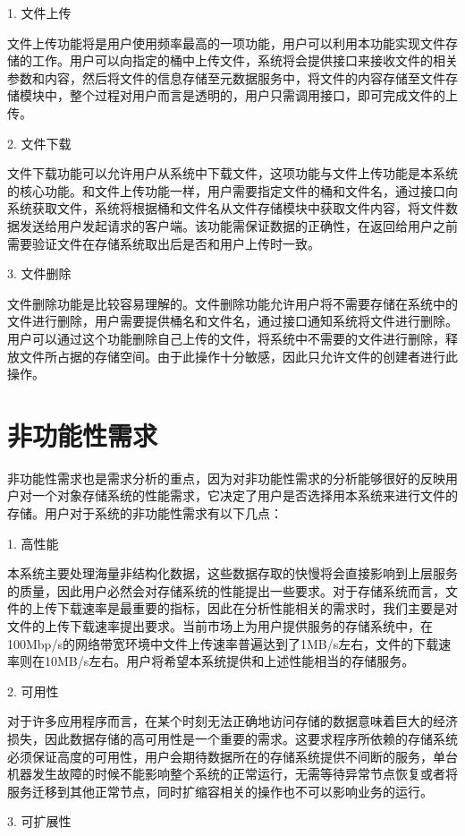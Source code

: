 1. 文件上传

文件上传功能将是用户使用频率最高的一项功能，用户可以利用本功能实现文件存储的工作。用户可以向指定的桶中上传文件，系统将会提供接口来接收文件的相关参数和内容，然后将文件的信息存储至元数据服务中，将文件的内容存储至文件存储模块中，整个过程对用户而言是透明的，用户只需调用接口，即可完成文件的上传。

2. 文件下载

文件下载功能可以允许用户从系统中下载文件，这项功能与文件上传功能是本系统的核心功能。和文件上传功能一样，用户需要指定文件的桶和文件名，通过接口向系统获取文件，系统将根据桶和文件名从文件存储模块中获取文件内容，将文件数据发送给用户发起请求的客户端。该功能需保证数据的正确性，在返回给用户之前需要验证文件在存储系统取出后是否和用户上传时一致。

3. 文件删除

文件删除功能是比较容易理解的。文件删除功能允许用户将不需要存储在系统中的文件进行删除，用户需要提供桶名和文件名，通过接口通知系统将文件进行删除。用户可以通过这个功能删除自己上传的文件，将系统中不需要的文件进行删除，释放文件所占据的存储空间。由于此操作十分敏感，因此只允许文件的创建者进行此操作。

\section{非功能性需求}
非功能性需求也是需求分析的重点，因为对非功能性需求的分析能够很好的反映用户对一个对象存储系统的性能需求，它决定了用户是否选择用本系统来进行文件的存储。用户对于系统的非功能性需求有以下几点：

1. 高性能

本系统主要处理海量非结构化数据，这些数据存取的快慢将会直接影响到上层服务的质量，因此用户必然会对存储系统的性能提出一些要求。对于存储系统而言，文件的上传下载速率是最重要的指标，因此在分析性能相关的需求时，我们主要是对文件的上传下载速率提出要求。当前市场上为用户提供服务的存储系统中，在100Mbp/s的网络带宽环境中文件上传速率普遍达到了1MB/s左右，文件的下载速率则在10MB/s左右。用户将希望本系统提供和上述性能相当的存储服务。

2. 可用性

对于许多应用程序而言，在某个时刻无法正确地访问存储的数据意味着巨大的经济损失，因此数据存储的高可用性是一个重要的需求。这要求程序所依赖的存储系统必须保证高度的可用性，用户会期待数据所在的存储系统提供不间断的服务，单台机器发生故障的时候不能影响整个系统的正常运行，无需等待异常节点恢复或者将服务迁移到其他正常节点，同时扩缩容相关的操作也不可以影响业务的运行。

3. 可扩展性

